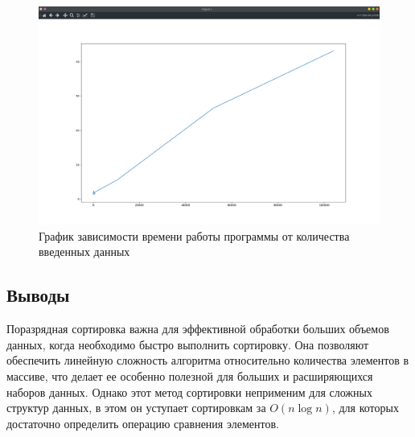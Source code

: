 \documentclass[12pt]{article}
\begin{document}
\begin{figure}
    \centering
    \includegraphics[width=\textwidth]{graph.png}
    \caption{График зависимости времени работы программы от количества введенных данных}
\end{figure}

\newpage
\subsection*{Выводы}

Поразрядная сортировка важна для эффективной обработки больших объемов данных, когда необходимо быстро выполнить сортировку.
Она позволяют обеспечить линейную сложность алгоритма относительно количества элементов в массиве,
что делает ее особенно полезной для больших и расширяющихся наборов данных.
Однако этот метод сортировки неприменим для сложных структур данных,
в этом он уступает сортировкам за $O(n \log n)$, для которых достаточно определить операцию сравнения элементов.
\end{document}
